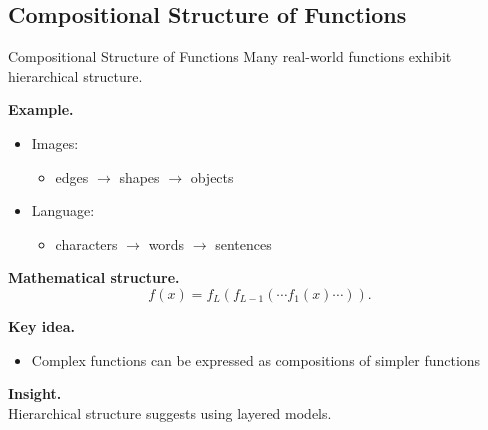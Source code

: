 \documentclass[aspectratio=169,11pt]{beamer}
\begin{document}
\subsection{Compositional Structure of Functions}
\begin{frame}[t,allowframebreaks]{Compositional Structure of Functions}
\small
Many real-world functions exhibit hierarchical structure.

\textbf{Example.}\\ \begin{itemize}
    \item Images:
    \begin{itemize}
        \item edges $\rightarrow$ shapes $\rightarrow$ objects
    \end{itemize}

    \item Language:
    \begin{itemize}
        \item characters $\rightarrow$ words $\rightarrow$ sentences
    \end{itemize}
\end{itemize}

\textbf{Mathematical structure.}\\ \[
f(x) = f_L(f_{L-1}(\cdots f_1(x)\cdots)).
\]

\textbf{Key idea.}\\ \begin{itemize}
    \item Complex functions can be expressed as compositions of simpler functions
\end{itemize}

\textbf{Insight.}\\ Hierarchical structure suggests using layered models.
\end{frame}
\end{document}

